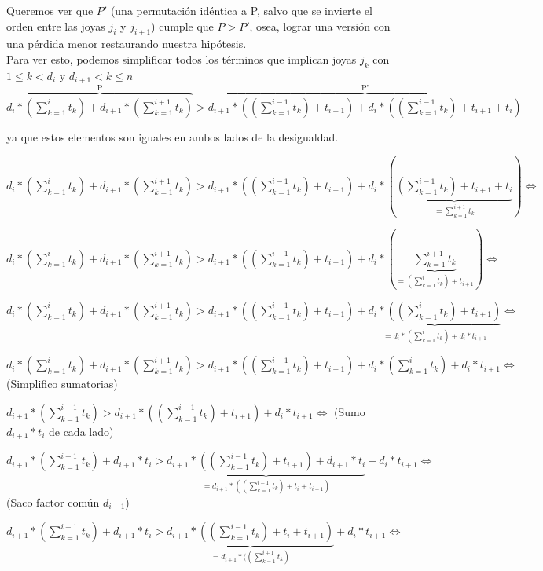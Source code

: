 Queremos ver que $P'$ (una permutaci\'on id\'entica a P, salvo que se invierte el orden entre las joyas $j_i$ y $j_{i+1}$) cumple que $P > P'$, osea, lograr una versi\'on con una p\'erdida menor restaurando nuestra hip\'otesis. \\

Para ver esto, podemos simplificar todos los t\'erminos que implican joyas $j_k$ con $1 \leq k < d_i$ y $d_{i+1} < k \leq n $ \\

$\overbrace{d_i*(\sum\limits_{k=1}^i t_k) + d_{i+1}*(\sum\limits_{k=1}^{i+1} t_k)}^{\text{P}} > \overbrace{d_{i+1}*((\sum\limits_{k=1}^{i-1} t_k) + t_{i+1}) + d_i*((\sum\limits_{k=1}^{i-1} t_k) + t_{i+1} + t_i)}^{\text{P'}}$

ya que estos elementos son iguales en ambos lados de la desigualdad.

$d_i*(\sum\limits_{k=1}^i t_k) + d_{i+1}*(\sum\limits_{k=1}^{i+1} t_k) > d_{i+1}*((\sum\limits_{k=1}^{i-1} t_k) + t_{i+1}) + d_i*(\underbrace{(\sum\limits_{k=1}^{i-1} t_k) + t_{i+1} + t_i}_{= \sum\limits_{k=1}^{i+1} t_k}) \Longleftrightarrow$

$d_i*(\sum\limits_{k=1}^i t_k) + d_{i+1}*(\sum\limits_{k=1}^{i+1} t_k) > d_{i+1}*((\sum\limits_{k=1}^{i-1} t_k) + t_{i+1}) + d_i*(\underbrace{\sum\limits_{k=1}^{i+1} t_k}_{= (\sum\limits_{k=1}^{i} t_k) + t_{i+1}}) \Longleftrightarrow$

$d_i*(\sum\limits_{k=1}^i t_k) + d_{i+1}*(\sum\limits_{k=1}^{i+1} t_k) > d_{i+1}*((\sum\limits_{k=1}^{i-1} t_k) + t_{i+1}) + \underbrace{d_i*((\sum\limits_{k=1}^{i} t_k) + t_{i+1})}_{= d_i*(\sum\limits_{k=1}^{i} t_k) + d_i*t_{i+1}} \Longleftrightarrow$

$d_i*(\sum\limits_{k=1}^i t_k) + d_{i+1}*(\sum\limits_{k=1}^{i+1} t_k) > d_{i+1}*((\sum\limits_{k=1}^{i-1} t_k) + t_{i+1}) + d_i*(\sum\limits_{k=1}^{i} t_k) + d_i*t_{i+1} \Longleftrightarrow$ (Simplifico sumatorias)

$d_{i+1}*(\sum\limits_{k=1}^{i+1} t_k) > d_{i+1}*((\sum\limits_{k=1}^{i-1} t_k) + t_{i+1}) + d_i*t_{i+1} \Longleftrightarrow$ (Sumo $d_{i+1}*t_i$ de cada lado)

$d_{i+1}*(\sum\limits_{k=1}^{i+1} t_k) + d_{i+1}*t_i > \underbrace{d_{i+1}*((\sum\limits_{k=1}^{i-1} t_k) + t_{i+1}) + d_{i+1}*t_i}_{= d_{i+1}*((\sum\limits_{k=1}^{i-1} t_k) + t_{i} + t_{i+1})} + d_i*t_{i+1} \Longleftrightarrow$ (Saco factor com\'un $d_{i+1}$)

$d_{i+1}*(\sum\limits_{k=1}^{i+1} t_k) + d_{i+1}*t_i > \underbrace{d_{i+1}*((\sum\limits_{k=1}^{i-1} t_k) + t_{i} + t_{i+1})}_{= d_{i+1}*((\sum\limits_{k=1}^{i+1} t_k)} + d_i*t_{i+1} \Longleftrightarrow$

